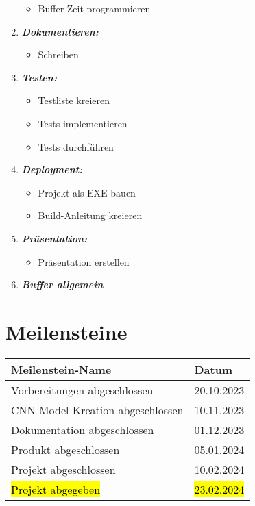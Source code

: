 \begin{enumerate}
\begin{itemize}
		\item Buffer Zeit programmieren 
	\end{itemize} 
	\item \textbf{\emph{Dokumentieren:}} 
	\begin{itemize} 
		\item Schreiben 
	\end{itemize} 
	\item \textbf{\emph{Testen:}} 
	\begin{itemize} 
		\item Testliste kreieren 
		\item Tests implementieren 
		\item Tests durchführen 
	\end{itemize} 
	\item \textbf{\emph{Deployment:}} 
	\begin{itemize} 
		\item Projekt als EXE bauen 
		\item Build-Anleitung kreieren 
	\end{itemize} 
	\item \textbf{\emph{Präsentation:}} 
	\begin{itemize} 
		\item Präsentation erstellen 
	\end{itemize}
	\item \textbf{\emph{Buffer allgemein}} 
\end{enumerate} 
\section{Meilensteine} 
\label{sec:PlanungMeilensteine} 

\begin{xltabular}{\linewidth}{|X|X|} 
	\hline Meilenstein-Name & Datum 
	\\\hline Vorbereitungen abgeschlossen & 20.10.2023 
	\\\hline CNN-Model Kreation abgeschlossen & 10.11.2023 
	\\\hline Dokumentation abgeschlossen & 01.12.2023 
	\\\hline Produkt abgeschlossen & 05.01.2024 
	\\\hline Projekt abgeschlossen & 10.02.2024 
	\\\hline \hl{Projekt abgegeben} & \hl{23.02.2024} 
	\\\hline 
\end{xltabular}

